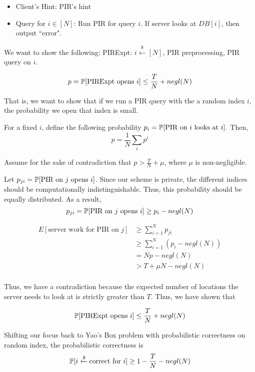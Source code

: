 \begin{itemize}
    \item Client's Hint: PIR's hint
    \item Query for $i \in [N]$: Run PIR for query $i$. If server looks at $DB[i]$, then output ``error".
\end{itemize}

We want to show the following: PIRExpt: $i \xleftarrow{\$} [N]$, PIR preprocessing, PIR query on $i$.

\[p =\mathbb{P}[\text{PIRExpt opens $i$}] \le \frac{T}{N} + negl(N)\]

That is, we want to show that if we run a PIR query with the a random index $i$, the probability we open that index is small.

For a fixed $i$, define the following probability $p_i = \mathbb{P}[\text{PIR on $i$ looks at $i$}].$ Then, 
\[p =\frac{1}{N} \sum_i p^i\]

Assume for the sake of contradiction that  $p > \frac{T}{N} + \mu$, where $\mu$ is non-negligible.

Let $p_{ji} = \mathbb{P}[\text{PIR on $j$ opens $i$}]$. Since our scheme is private, the different indices should be computationally indistinguishable. Thus, this probability should be equally distributed. As a result,
\[p_{ji} = \mathbb{P}[\text{PIR on $j$ opens $i$}] \ge p_i - negl(N)\]

\begin{align*}
    E[\text{server work for PIR on $j$}] &\ge \sum_{i=1}^N p_{ji} \\
    &\ge \sum_{i=1}^N (p_{i} - negl(N))\\
    &= Np - negl(N) \tag{By def. of $p$}\\
    &> T + \mu N - negl(N) \tag{By our AFTSOC assumption}\\ 
\end{align*}

Thus, we have a contradiction because the expected number of locations the server needs to look at is strictly greater than $T$. Thus, we have shown that 

\[\mathbb{P}[\text{PIRExpt opens $i$}] \le \frac{T}{N} + negl(N)\]

\vspace{5mm}

Shifting our focus back to Yao's Box problem with probabilistic correctness on random index, the probabilistic correctness is
\[\mathbb{P}[i \xleftarrow{\$} \text{correct for $i$}] \ge 1 - \frac{T}{N} - negl(N)\]

